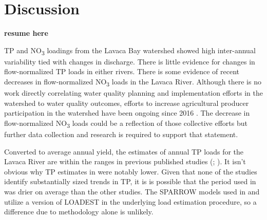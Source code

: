\documentclass[sn-basic,referee,lineno,pdflatex]{sn-jnl}
\begin{document}
\hypertarget{discussion}{%
\section{Discussion}\label{discussion}}

\textbf{resume here}

TP and NO\textsubscript{3} loadings from the Lavaca Bay watershed showed
high inter-annual variability tied with changes in discharge. There is
little evidence for changes in flow-normalized TP loads in either
rivers. There is some evidence of recent decreases in flow-normalized
NO\textsubscript{3} loads in the Lavaca River. Although there is no work
directly correlating water quality planning and implementation efforts
in the watershed to water quality outcomes, efforts to increase
agricultural producer participation in the watershed have been ongoing
since 2016
\citep{schrammLavacaRiverWatershed2018, bertholdDirectMailingEducation2021}.
The decrease in flow-normalized NO\textsubscript{3} loads could be a
reflection of those collective efforts but further data collection and
research is required to support that statement.

Converted to average annual yield, the estimates of annual TP loads for
the Lavaca River are within the ranges in previous published studies
(\citet{tbl-table5};
\citep{dunnTrendsNutrientInflows1996, rebichSourcesDeliveryNutrients2011, omaniEstimationSedimentNutrient2014, wise_spatially_2019}).
It isn't obvious why TP estimates in
\citet{dunnTrendsNutrientInflows1996} were notably lower. Given that
none of the studies identify substantially sized trends in TP, it is is
possible that the period used in \citet{dunnTrendsNutrientInflows1996}
was drier on average than the other studies. The SPARROW models used in
\citet{rebichSourcesDeliveryNutrients2011} and
\citet{wise_spatially_2019} utilize a version of LOADEST in the
underlying load estimation procedure, so a difference due to methodology
alone is unlikely.
\end{document}
